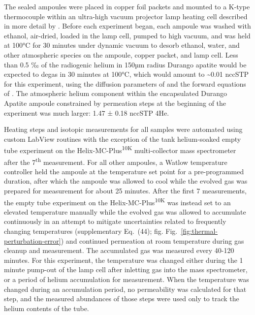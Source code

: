 The sealed ampoules were placed in copper foil packets and mounted to a K-type thermocouple within an ultra-high vacuum projector lamp heating cell described in more detail by \citet{farley1999}. Before each experiment began, each ampoule was washed with ethanol, air-dried, loaded in the lamp cell, pumped to high vacuum, and was held at 100°C for 30 minutes under dynamic vacuum to desorb ethanol, water, and other atmospheric species on the ampoule, copper packet, and lamp cell. Less than 0.5 ‰ of the radiogenic helium in 150µm radius Durango apatite would be expected to degas in 30 minutes at 100°C, which would amount to \textasciitilde0.01 nccSTP for this experiment, using the diffusion parameters of \citet{farley2000} and the forward equations of \citet{fechtigkalbitzer1966}. The atmospheric helium component within the encapsulated Durango Apatite ampoule constrained by permeation steps at the beginning of the experiment was much larger: 1.47 ± 0.18 nccSTP 4He.

Heating steps and isotopic measurements for all samples were automated using custom LabView routines with the exception of the tank helium-soaked empty tube experiment on the Helix-MC-Plus\textsuperscript{10K} multi-collector mass spectrometer after the 7\textsuperscript{th} measurement. For all other ampoules, a Watlow temperature controller held the ampoule at the temperature set point for a pre-programmed duration, after which the ampoule was allowed to cool while the evolved gas was prepared for measurement for about 25 minutes. After the first 7 measurements, the empty tube experiment on the Helix-MC-Plus\textsuperscript{10K} was instead set to an elevated temperature manually while the evolved gas was allowed to accumulate continuously in an attempt to mitigate uncertainties related to frequently changing temperatures (supplementary Eq.~(44); fig. Fig.~\ref{fig:thermal-perturbation-error}) and continued permeation at room temperature during gas cleanup and measurement. The accumulated gas was measured every 40-120 minutes. For this experiment, the temperature was changed either during the 1 minute pump-out of the lamp cell after inletting gas into the mass spectrometer, or a period of helium accumulation for measurement. When the temperature was changed during an accumulation period, no permeability was calculated for that step, and the measured abundances of those steps were used only to track the helium contents of the tube.

